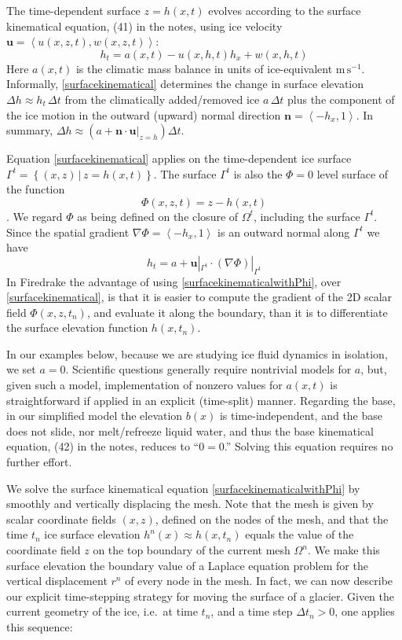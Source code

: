 \documentclass[letterpaper,final,12pt,reqno]{amsart}
\newcommand{\grad}{\nabla}
\newcommand{\bn}{\mathbf{n}}
\newcommand{\bu}{\mathbf{u}}
\begin{document}
The time-dependent surface $z=h(x,t)$ evolves according to the surface kinematical equation, (41) in the notes, using ice velocity $\bu=\left<u(x,z,t),w(x,z,t)\right>$:
\begin{equation}
h_t = a(x,t) - u(x,h,t) h_x + w(x,h,t) \label{surfacekinematical}
\end{equation}
Here $a(x,t)$ is the climatic mass balance in units of ice-equivalent $\text{m}\,\text{s}^{-1}$.  Informally, \eqref{surfacekinematical} determines the change in surface elevation $\Delta h \approx h_t\,\Delta t$ from the climatically added/removed ice $a\,\Delta t$ plus the component of the ice motion in the outward (upward) normal direction $\bn = \left<-h_x,1\right>$.  In summary, $\Delta h \approx \left(a + \bn\cdot \bu|_{z=h}\right) \Delta t$.

Equation \eqref{surfacekinematical} applies on the time-dependent ice surface $\Gamma^t = \left\{(x,z) \,\big|\, z = h(x,t)\right\}$.  The surface $\Gamma^t$ is also the $\Phi=0$ level surface of the function
    $$\Phi(x,z,t) = z - h(x,t)$$
\cite[pp.~65--66]{GreveBlatter2009}.  We regard $\Phi$ as being defined on the closure of $\Omega^t$, including the surface $\Gamma^t$.  Since the spatial gradient $\grad \Phi = \left<-h_x,1\right>$ is an outward normal along $\Gamma^t$ we have
\begin{equation}
h_t = a + \bu|_{\Gamma^t} \cdot (\grad \Phi)|_{\Gamma^t}  \label{surfacekinematicalwithPhi}
\end{equation}
In Firedrake the advantage of using \eqref{surfacekinematicalwithPhi}, over \eqref{surfacekinematical}, is that it is easier to compute the gradient of the 2D scalar field $\Phi(x,z,t_n)$, and evaluate it along the boundary, than it is to differentiate the surface elevation function $h(x,t_n)$.

In our examples below, because we are studying ice fluid dynamics in isolation, we set $a=0$.  Scientific questions generally require nontrivial models for $a$, but, given such a model, implementation of nonzero values for $a(x,t)$ is straightforward if applied in an explicit (time-split) manner.  Regarding the base, in our simplified model the elevation $b(x)$ is time-independent, and the base does not slide, nor melt/refreeze liquid water, and thus the base kinematical equation, (42) in the notes, reduces to ``$0=0$.''  Solving this equation requires no further effort.

We solve the surface kinematical equation \eqref{surfacekinematicalwithPhi} by smoothly and vertically displacing the mesh.  Note that the mesh is given by scalar coordinate fields $(x,z)$, defined on the nodes of the mesh, and that the time $t_n$ ice surface elevation $h^n(x) \approx h(x,t_n)$ equals the value of the coordinate field $z$ on the top boundary of the current mesh $\Omega^n$.  We make this surface elevation the boundary value of a Laplace equation problem for the vertical displacement $r^n$ of every node in the mesh.  In fact, we can now describe our explicit time-stepping strategy for moving the surface of a glacier.  Given the current geometry of the ice, i.e.~at time $t_n$, and a time step $\Delta t_n > 0$, one applies this sequence:
\end{document}
